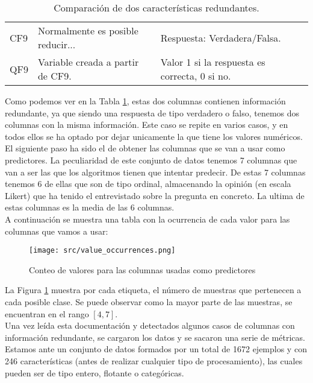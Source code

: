 \begin{table}[H]
	\begin{tabular}{|l|l|l|}
		\cline{1-3}
		CF9 & Normalmente es posible reducir... & Respuesta: Verdadera/Falsa.                   \\ \cline{1-3}
		QF9 & Variable creada a partir de CF9.  & Valor 1 si la respuesta es correcta, 0 si no. \\ \cline{1-3}
	\end{tabular}
	\label{tab:columnas_iguales}
	\caption{Comparación de dos características redundantes.}
\end{table}
Como podemos ver en la Tabla \ref{tab:columnas_iguales}, estas dos columnas contienen información redundante, ya que siendo una respuesta de tipo verdadero o falso, tenemos dos columnas con la misma información. Este caso se repite en varios casos, y en todos ellos se ha optado por dejar unicamente la que tiene los valores numéricos.\\
\linebreak
El siguiente paso ha sido el de obtener las columnas que se van a usar como predictores.
La peculiaridad de este conjunto de datos tenemos 7 columnas que van a ser las que los algoritmos tienen que intentar predecir. De estas 7 columnas tenemos 6 de ellas que son de tipo ordinal, almacenando la opinión (en escala Likert) que ha tenido el entrevistado sobre la pregunta en concreto. La ultima de estas columnas es la media de las 6 columnas.\\
A continuación se muestra una tabla con la ocurrencia de cada valor para las columnas que vamos a usar:\\
\linebreak
\begin{figure}[H]
	\centering
	\texttt{[image: src/value\_occurrences.png]}
	\caption{Conteo de valores para las columnas usadas como predictores}
	\label{tab:ocurrencia_valores}
\end{figure}
La Figura \ref{tab:ocurrencia_valores} muestra por cada etiqueta, el número de muestras que pertenecen a cada posible clase. Se puede observar como la mayor parte de las muestras, se encuentran en el rango $\left[4,7\right]$.\\
\linebreak
Una vez leída esta documentación y detectados algunos casos de columnas con información redundante, se cargaron los datos y se sacaron una serie de métricas. Estamos ante un conjunto de datos formados por un total de 1672 ejemplos y con 246 características (antes de realizar cualquier tipo de procesamiento), las cuales pueden ser de tipo entero, flotante o categóricas.
\pagebreak
